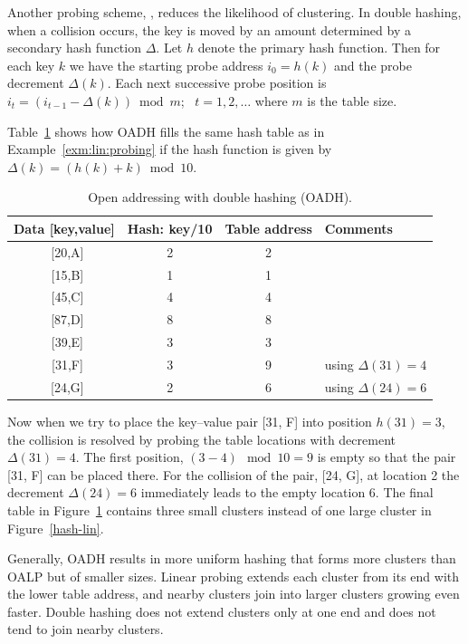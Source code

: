 Another probing scheme, , reduces the 
likelihood of clustering. In double hashing, when a collision occurs, the key
is moved by an amount determined by a secondary hash function \(\Delta\).  Let \(h\) denote
the primary hash function. Then for each key \(k\) we have the starting probe 
address \(i_{0} = h(k)\) and the probe decrement \(\Delta(k)\). Each
next successive probe position is 
\(i_{t} = ( i_{t-1} - \Delta(k) ) \bmod m\); \
\(t=1,2,\ldots\) where $m$ is the table size.

\begin{Example}\label{exm:double:hashing}
Table~\ref{hash-dbl} shows how OADH fills the same hash table as in
Example~\ref{exm:lin:probing} if the 
hash function is given by \(\Delta(k) = (h(k) + k) \bmod 10\).

\begin{table}[hbt]
\begin{center}
\caption{\label{hash-dbl} Open addressing with double hashing (OADH).}
\begin{tabular}{|c|c|c|l|} \hline 
\textbf{Data} [key,value] & \textbf{Hash}: key/10 & \textbf{Table address} & \textbf{Comments} \\ \hline
~[20,A] & 2 & 2 & \\
~[15,B] & 1 & 1 & \\
~[45,C] & 4 & 4 & \\
~[87,D] & 8 & 8 & \\
~[39,E] & 3 & 3 & \\
~[31,F] & 3 & 9 & using $\Delta(31)=4$ \\
~[24,G] & 2 & 6 & using $\Delta(24)=6$ \\ \hline
\end{tabular}
\end{center}
\end{table}

Now when we try to place the key--value 
pair [31, F] into position \(h(31) = 3\), the collision 
is resolved by probing the table locations with decrement
\(\Delta(31) = 4\). The first position, \((3-4)\mod 10 = 9\) is
empty so that the pair [31, F] can be placed there. 
For the collision of the pair, [24, G], at location 2 
the decrement \(\Delta(24) = 6\) immediately leads to
the empty location $6$. The final table
in Figure~\ref{hash-dbl} contains three small clusters 
instead of one large
cluster in Figure~\ref{hash-lin}. 
\end{Example}

Generally, OADH results in more uniform hashing that
forms more clusters than OALP but of smaller sizes.
Linear probing extends each cluster from its end with
the lower table address, and nearby clusters join into
larger clusters growing even faster. Double hashing does
not extend clusters only at one end and does not tend
to join nearby clusters.



